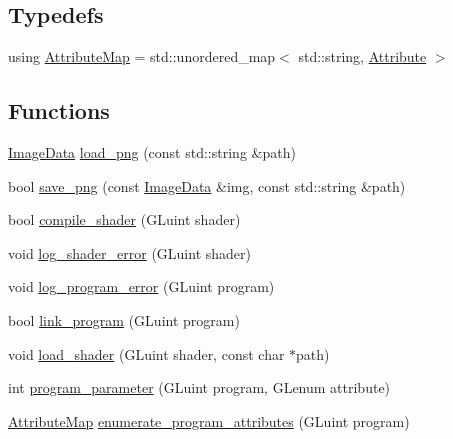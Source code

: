 \subsection*{Typedefs}
\begin{DoxyCompactItemize}
\item 
using \hyperlink{namespacepixel_1_1graphics_ab235534714f227408c552e912c5985de}{Attribute\+Map} = std\+::unordered\+\_\+map$<$ std\+::string, \hyperlink{structpixel_1_1graphics_1_1_attribute}{Attribute} $>$
\end{DoxyCompactItemize}
\subsection*{Functions}
\begin{DoxyCompactItemize}
\item 
\hyperlink{structpixel_1_1graphics_1_1_image_data}{Image\+Data} \hyperlink{namespacepixel_1_1graphics_a719505e54207dc3fb06242ed6587081e}{load\+\_\+png} (const std\+::string \&path)
\item 
bool \hyperlink{namespacepixel_1_1graphics_a202dcdb746e8d6064ca1b3a0f3f54987}{save\+\_\+png} (const \hyperlink{structpixel_1_1graphics_1_1_image_data}{Image\+Data} \&img, const std\+::string \&path)
\item 
bool \hyperlink{namespacepixel_1_1graphics_a46b2582a20b7efd452ad00943782116f}{compile\+\_\+shader} (G\+Luint shader)
\item 
void \hyperlink{namespacepixel_1_1graphics_a74768685f403447357cc9be65be53f86}{log\+\_\+shader\+\_\+error} (G\+Luint shader)
\item 
void \hyperlink{namespacepixel_1_1graphics_ae25919fb3b3b437e1f71b1a69d6938d5}{log\+\_\+program\+\_\+error} (G\+Luint program)
\item 
bool \hyperlink{namespacepixel_1_1graphics_abc8f110adf4be5b76408feb64a945f48}{link\+\_\+program} (G\+Luint program)
\item 
void \hyperlink{namespacepixel_1_1graphics_af428e812eb483510b5935cf0fdaa930e}{load\+\_\+shader} (G\+Luint shader, const char $\ast$path)
\item 
int \hyperlink{namespacepixel_1_1graphics_aa90ad6978f688dc64ca65943cfd3b3a7}{program\+\_\+parameter} (G\+Luint program, G\+Lenum attribute)
\item 
\hyperlink{namespacepixel_1_1graphics_ab235534714f227408c552e912c5985de}{Attribute\+Map} \hyperlink{namespacepixel_1_1graphics_a44295d52f1dbfcf05d96984a03dc7dfc}{enumerate\+\_\+program\+\_\+attributes} (G\+Luint program)

\end{DoxyCompactItemize}

